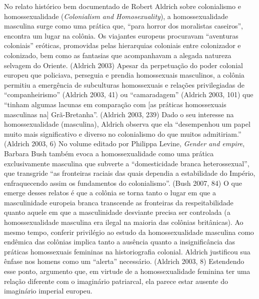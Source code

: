 No relato histórico bem documentado de Robert Aldrich sobre colonialismo
e homossexualidade (\emph{Colonialism and Homosexuality}), a
homossexualidade masculina surge como uma prática que, ``para horror dos
moralistas caseiros'', encontra um lugar na colônia. Os viajantes
europeus procuravam ``aventuras coloniais'' eróticas, promovidas pelas
hierarquias coloniais entre colonizador e colonizado, bem como as
fantasias que acompanhavam a alegada natureza selvagem do Oriente.
(Aldrich 2003) Apesar da perpetuação do poder colonial europeu que
policiava, perseguia e prendia homossexuais masculinos, a colônia
permitiu a emergência de subculturas homossexuais e relações
privilegiadas de ``companheirismo'' (Aldrich 2003, 41) ou ``camaradagem''
(Aldrich 2003, 101) que ``tinham algumas lacunas em comparação com {[}as
práticas homossexuais masculinas na{]} Grã-Bretanha''. (Aldrich 2003,
239) Dado o seu interesse na homossexualidade (masculina), Aldrich
observa que ela ``desempenhou um papel muito mais significativo e
diverso no colonialismo do que muitos admitiriam.'' (Aldrich 2003, 6) No
volume editado por Philippa Levine, \emph{Gender and empire}, Barbara
Bush também evoca a homossexualidade como uma prática exclusivamente
masculina que subverte a ``domesticidade branca heterossexual'', que
transgride ``as fronteiras raciais das quais dependia a estabilidade do
Império, enfraquecendo assim os fundamentos do colonialismo''. (Bush
2007, 84) O que emerge desses relatos é que a colônia se torna tanto o
lugar em que a masculinidade europeia branca transcende as fronteiras da
respeitabilidade quanto aquele em que a masculinidade desviante precisa
ser controlada (a homossexualidade masculina era ilegal na maioria das
colônias britânicas). Ao mesmo tempo, conferir privilégio ao estudo da
homossexualidade masculina como endêmica das colônias implica tanto a
ausência quanto a insignificância das práticas homossexuais femininas na
historiografia colonial. Aldrich justificou sua ênfase nos homens como
um ``alerta'' necessário. (Aldrich 2003, 8) Estendendo esse ponto,
argumento que, em virtude de a homossexualidade feminina ter uma relação
diferente com o imaginário patriarcal, ela parece estar ausente do
imaginário imperial europeu.

